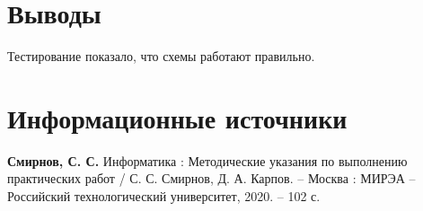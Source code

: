 \documentclass[14pt, a4paper]{extreport}
\begin{document}
\chapter{Выводы}
Тестирование показало, что схемы работают правильно.

\chapter{Информационные источники}
\textbf{Смирнов, С. С.} Информатика : Методические указания по выполнению практических работ / С. С. Смирнов, Д. А. Карпов. -- Москва : МИРЭА -- Российский технологический университет, 2020. -- 102 с.
\end{document}
